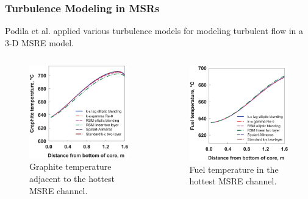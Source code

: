 \begin{frame}
  \frametitle{Turbulence Modeling in MSRs}
  Podila et al. \cite{podila_cfd_2019} applied various turbulence models for modeling turbulent
  flow in a 3-D MSRE model.
  \begin{columns}
    \column[t]{5.5cm}
  \begin{figure}
    \centering
    \includegraphics[width=.8\columnwidth]{images/podila-graphite}
    \caption{Graphite temperature adjacent to the hottest MSRE channel.}
  \end{figure}
  \column[t]{5.5cm}
  \begin{figure}
    \centering
    \includegraphics[width=.8\columnwidth]{images/podila-fuel}
    \caption{Fuel temperature in the hottest MSRE channel.}
  \end{figure}
\end{columns}
\end{frame}
